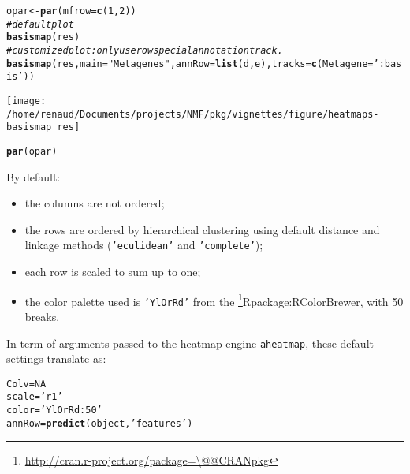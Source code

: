 \documentclass[a4paper]{article}\usepackage[]{graphicx}\usepackage[]{color}
\makeatletter
\def\maxwidth{ %
  \ifdim\Gin@nat@width>\linewidth
    \linewidth
  \else
    \Gin@nat@width
  \fi
}
\newcommand{\hlnum}[1]{\textcolor[rgb]{0.686,0.059,0.569}{#1}}%
\newcommand{\hlstr}[1]{\textcolor[rgb]{0.192,0.494,0.8}{#1}}%
\newcommand{\hlcom}[1]{\textcolor[rgb]{0.678,0.584,0.686}{\textit{#1}}}%
\newcommand{\hlstd}[1]{\textcolor[rgb]{0.345,0.345,0.345}{#1}}%
\newcommand{\hlkwb}[1]{\textcolor[rgb]{0.69,0.353,0.396}{#1}}%
\newcommand{\hlkwc}[1]{\textcolor[rgb]{0.333,0.667,0.333}{#1}}%
\newcommand{\hlkwd}[1]{\textcolor[rgb]{0.737,0.353,0.396}{\textbf{#1}}}%
\newenvironment{kframe}{%
 \def\at@end@of@kframe{}%
 \ifinner\ifhmode%
  \def\at@end@of@kframe{\end{minipage}}%
  \begin{minipage}{\columnwidth}%
 \fi\fi%
 \def\FrameCommand##1{\hskip\@totalleftmargin \hskip-\fboxsep
 \colorbox{shadecolor}{##1}\hskip-\fboxsep
     \hskip-\linewidth \hskip-\@totalleftmargin \hskip\columnwidth}%
 \MakeFramed {\advance\hsize-\width
   \@totalleftmargin\z@ \linewidth\hsize
   \@setminipage}}%
 {\par\unskip\endMakeFramed%
 \at@end@of@kframe}
\newenvironment{knitrout}{}{} %
\let\code=\texttt
\newcommand{\pkgname}[1]{\textit{#1}\xspace}
\newcommand{\CRANurl}[1]{\url{http://cran.r-project.org/package=#1}}
\def\CRANpkg{\@ifstar\@CRANpkg\@@CRANpkg}
\def\@CRANpkg#1{\href{http://cran.r-project.org/package=#1}{\pkgname{#1}}\footnote{\CRANurl{#1}}}
\def\@@CRANpkg#1{\href{http://cran.r-project.org/package=#1}{\pkgname{#1}} package\footnote{\CRANurl{#1}}}
\def\citeCRANpkg{\@ifstar\@citeCRANpkg\@@citeCRANpkg}
\def\@citeCRANpkg#1{\CRANpkg{#1}\cite*{Rpackage:#1}}
\def\@@citeCRANpkg#1{\CRANpkg{#1}~\cite{Rpackage:#1}}
\renewcommand{\cite}[1]{\parencite{#1}}
\makeatother
\begin{document}
\begin{knitrout}
\color{fgcolor}\begin{kframe}
\begin{alltt}
\hlstd{opar} \hlkwb{<-} \hlkwd{par}\hlstd{(}\hlkwc{mfrow}\hlstd{=}\hlkwd{c}\hlstd{(}\hlnum{1}\hlstd{,}\hlnum{2}\hlstd{))}
\hlcom{# default plot}
\hlkwd{basismap}\hlstd{(res)}
\hlcom{# customized plot: only use row special annotation track.  }
\hlkwd{basismap}\hlstd{(res,} \hlkwc{main}\hlstd{=}\hlstr{"Metagenes"}\hlstd{,} \hlkwc{annRow}\hlstd{=}\hlkwd{list}\hlstd{(d, e),} \hlkwc{tracks}\hlstd{=}\hlkwd{c}\hlstd{(}\hlkwc{Metagene}\hlstd{=}\hlstr{':basis'}\hlstd{))}
\end{alltt}
\end{kframe}
\texttt{[image: /home/renaud/Documents/projects/NMF/pkg/vignettes/figure/heatmaps-basismap\_res]} 
\begin{kframe}\begin{alltt}
\hlkwd{par}\hlstd{(opar)}
\end{alltt}
\end{kframe}
\end{knitrout}

By default:
\begin{itemize}
\item the columns are not ordered;
\item the rows are ordered by hierarchical clustering using default distance and 
linkage methods (\code{'eculidean'} and \code{'complete'});
\item each row is scaled to sum up to one;
\item the color palette used is \code{'YlOrRd'} from the
\citeCRANpkg{RColorBrewer}, with 50 breaks.
\end{itemize}

In term of arguments passed to the heatmap engine \code{aheatmap}, these default 
settings translate as:

\begin{knitrout}
\color{fgcolor}\begin{kframe}
\begin{alltt}
\hlstd{Colv} \hlkwb{=} \hlnum{NA}
\hlstd{scale} \hlkwb{=} \hlstr{'r1'}
\hlstd{color} \hlkwb{=} \hlstr{'YlOrRd:50'}
\hlstd{annRow} \hlkwb{=} \hlkwd{predict}\hlstd{(object,} \hlstr{'features'}\hlstd{)}
\end{alltt}
\end{kframe}
\end{knitrout}
\end{document}
